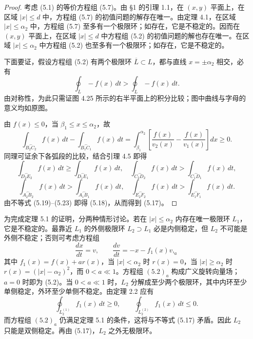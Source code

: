 \begin{proof}
考虑 (5.1) 的等价方程组 (5.7)。由 \S1 的引理 1.1，在 $(x,y)$ 平面上，在区域 $|x|\leqslant d$ 中，方程组 (5.7) 的初值问题的解存在唯一。由定理 4.1，在区域 $|x|\leqslant\alpha_2$ 中，方程组 (5.7) 至多有一个极限环；如存在，它是不稳定的。因而在 $(x,y)$ 平面上，在区域 $|x|\leqslant d$ 中方程组 (5.2) 的初值问题的解也存在唯一。在区域 $|x|\leqslant\alpha_2$ 中方程组 (5.2) 也至多有一个极限环；如存在，它是不稳定的。

下面要证，假设方程组 (5.2) 有两个极限环 $\overline L\subset L$，都与直线 $x=\pm\alpha_2$ 相交，必有
\begin{equation}
\oint_{\overline L}-f(x)\,dt>\oint_L-f(x)\,dt.\tag{5.17}
\end{equation}
由对称性，为此只需证图 4.25 所示的右半平面上的积分比较；图中曲线与字母的意义均如原图。


由 $f(x)\leqslant0$，当 $\beta_1\leqslant x\leqslant\alpha_2$，故
\[
\int_{\overset{\frown}{B_2C_2}}f(x)\,dt-\int_{\overset{\frown}{B_1C_1}}f(x)\,dt
=\int_{\beta_1}^{\alpha_2}\left[\dfrac{f(x)}{v_2(x)}-\dfrac{f(x)}{v_1(x)}\right]dx\geqslant0.
\tag{5.19}
\]
同理可证余下各弧段的比较，结合引理 4.5 即得
\[
\int_{\overset{\frown}{D_2E_2}}f(x)\,dt\geqslant\int_{\overset{\frown}{D_1E_1}}f(x)\,dt,\quad
\int_{\overset{\frown}{C_2D_2}}f(x)\,dt>\int_{\overset{\frown}{C_1D_1}}f(x)\,dt,
\]
\[
\int_{\overset{\frown}{A_2B_2}}f(x)\,dt>\int_{\overset{\frown}{A_1B_1}}f(x)\,dt,\quad
\int_{\overset{\frown}{E_2F_2}}f(x)\,dt>\int_{\overset{\frown}{E_1F_1}}f(x)\,dt.
\]
由不等式 (5.19)--(5.23) 即得 (5.18)，从而得到 (5.17)。
\end{proof}

为完成定理 5.1 的证明，分两种情形讨论。若在 $|x|\leqslant\alpha_2$ 内存在唯一极限环 $L_1$，它是不稳定的。最靠近 $L_1$ 的外侧极限环 $L_2\supset L_1$ 必是内侧稳定，但 $L_2$ 不可能是外侧不稳定；否则可考虑方程组
\[
\dfrac{dx}{dt}=v,\qquad \dfrac{dv}{dt}=-x-f_1(x)v,\tag{5.2}_a
\]
其中 $f_1(x)=f(x)+ar(x)$，当 $|x|<\alpha_2$ 时 $r(x)=0$，当 $|x|\geqslant\alpha_2$ 时 $r(x)=(|x|-\alpha_2)^2$，而 $0<a\ll1$。方程组 $(5.2)_a$ 构成广义旋转向量场；$a=0$ 时即为 (5.2)。当 $0<a\ll1$ 时，$L_2$ 分解成至少两个极限环，其中内环至少单侧稳定，外环至少单侧不稳定。由定理 2.2 应有
\[
\oint_{L_2^{(1)}}f_1(x)\,dt\geqslant0,\qquad
\oint_{L_2^{(2)}}f_1(x)\,dt\leqslant0.
\]
而方程组 $(5.2)_a$ 仍满足定理 5.1 的条件，这将与不等式 (5.17) 矛盾。因此 $L_2$ 只能是双侧稳定。再由 (5.17)，$L_2$ 之外无极限环。

